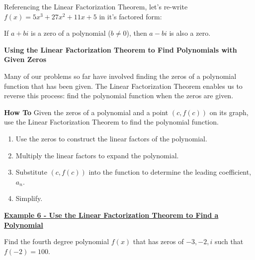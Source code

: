 \documentclass[12pt]{book}
\begin{document}
Referencing the Linear Factorization Theorem, let's re-write $f(x)=5x^3+27x^2+11x+5$ in it's factored form:


\vspace{45mm}

\begin{boxR}
    If $a+bi$ is a zero of a polynomial ($b\neq 0$), then $a-bi$ is also a zero. 
\end{boxR}
\newpage

{\large \textbf{Using the Linear Factorization Theorem to Find Polynomials with Given Zeros}}

Many of our problems so far have involved finding the zeros of a polynomial function that has been given. The Linear Factorization Theorem enables us to reverse this process: find the polynomial function when the zeros are given.  

\vspace{3mm}
\begin{boxR}
    \textbf{How To}
    \vspace{1mm}
    \hline
    \vspace{2mm}
Given the zeros of a polynomial and a point $(c, f(c))$ on its graph, use the Linear Factorization Theorem to find the polynomial function.
\begin{enumerate}
    \item Use the zeros to construct the linear factors of the polynomial.
    \item Multiply the linear factors to expand the polynomial.
    \item Substitute $(c, f(c))$ into the function to determine the leading coefficient, $a_n$.
    \item Simplify.
\end{enumerate}
\end{boxR}

\underline{\textbf{Example 6 - Use the Linear Factorization Theorem to Find a Polynomial}} 

Find the fourth degree polynomial $f(x)$ that has zeros of $-3, -2, i$ such that $f(-2)=100$.
\end{document}
